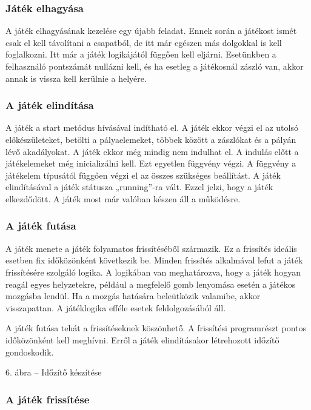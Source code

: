 \documentclass[bibliography=totocnumbered]{article}
\begin{document}
\subsubsection{Játék elhagyása}

A játék elhagyásának kezelése egy újabb feladat. Ennek során a játékost
ismét csak el kell távolítani a csapatból, de itt már egészen más
dolgokkal is kell foglalkozni. Itt már a játék logikájától függően kell
eljárni. Esetünkben a felhasználó pontszámát nullázni kell, és ha
esetleg a játékosnál zászló van, akkor annak is vissza kell kerülnie a
helyére.


\subsubsection{A játék
elindítása}

A játék a start metódus hívásával indítható el. A játék ekkor végzi el
az utolsó előkészületeket, betölti a pályaelemeket, többek között a
zászlókat és a pályán lévő akadályokat. A játék ekkor még mindig nem
indulhat el. A indulás előtt a játékelemeket még inicializálni kell. Ezt
egyetlen függvény végzi. A függvény a játékelem típusától függően végzi
el az összes szükséges beállítást. A játék elindításával a játék
státusza „running''-ra vált. Ezzel jelzi, hogy a játék elkezdődött. A
játék most már valóban készen áll a működésre.


\subsubsection{A játék futása}

A játék menete a játék folyamatos frissítéséből származik. Ez a
frissítés ideális esetben fix időközönként következik be. Minden
frissítés alkalmával lefut a játék frissítésére szolgáló logika. A
logikában van meghatározva, hogy a játék hogyan reagál egyes
helyzetekre, például a megfelelő gomb lenyomása esetén a játékos
mozgásba lendül. Ha a mozgás hatására beleütközik valamibe, akkor
visszapattan. A játéklogika efféle esetek feldolgozásából áll.

A játék futása tehát a frissítéseknek köszönhető. A frissítési
programrészt pontos időközönként kell meghívni. Erről a játék
elindításakor létrehozott időzítő gondoskodik.

6. ábra -- Időzítő készítése


\subsubsection{A játék
frissítése}
\end{document}
